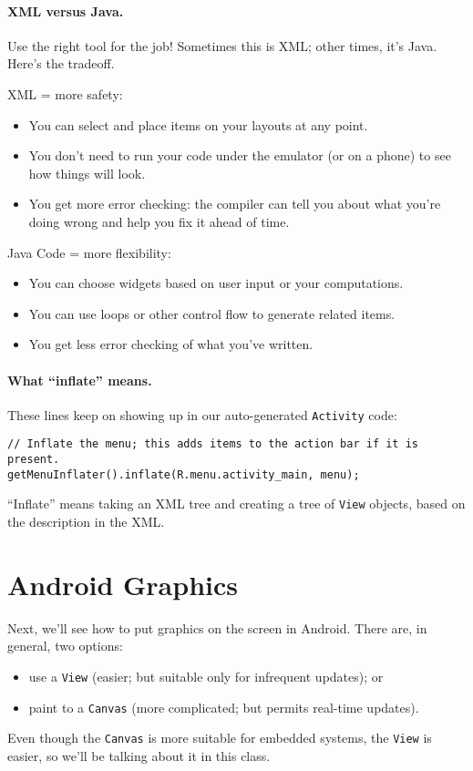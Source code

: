 \paragraph{XML versus Java.}
Use the right tool for the job! Sometimes this is XML; other times,
it's Java. Here's the tradeoff.

XML = more safety:
\begin{itemize}
\item You can select and place items on your layouts at any point.
\item You don't need to run your code under the emulator (or on a
  phone) to see how things will look.
\item You get more error checking: the compiler can tell you about
what you're doing wrong and help you fix it ahead of time.
\end{itemize}

Java Code = more flexibility:
\begin{itemize}
\item You can choose widgets based on user input or your computations.
\item You can use loops or other control flow to generate related items.
\item You get less error checking of what you've written.
\end{itemize}

\paragraph{What ``inflate'' means.}
These lines keep on showing up in our auto-generated {\tt Activity} code:
{\tiny
\begin{verbatim}
// Inflate the menu; this adds items to the action bar if it is present.
getMenuInflater().inflate(R.menu.activity_main, menu);
\end{verbatim}
}

``Inflate'' means taking an XML tree and creating a tree of {\tt View}
objects, based on the description in the XML.

\newpage
\section*{Android Graphics}
Next, we'll see how to put graphics on the screen in Android. 
There are, in general, two options:
\begin{itemize}
\item use a {\tt View} (easier; but suitable only for infrequent updates); or
\item paint to a {\tt Canvas} (more complicated; but permits real-time updates).
\end{itemize}
Even though the {\tt Canvas} is more suitable for embedded systems, 
the {\tt View} is easier, so we'll be talking about it in this class.

